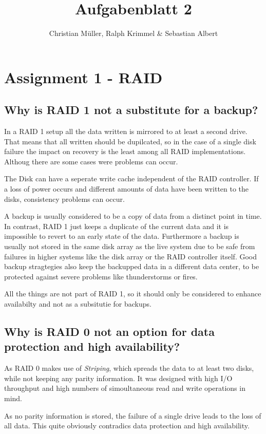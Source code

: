 \documentclass{article}
\title{Aufgabenblatt 2}
\author{Christian Müller, Ralph Krimmel \& Sebastian Albert }
\begin{document}
\maketitle

\section*{Assignment 1 - RAID}

\subsection{Why is RAID 1 not a substitute for a backup?}
	In a RAID 1 setup all the data written is mirrored to at least a second drive.
	That means that all written should be dupilcated,
	so in the case of a single disk failure the impact on recovery is the least among all RAID implementations.
	Althoug there are some cases were problems can occur.

	The Disk can have a seperate write cache independent of the RAID controller.
	If a loss of power occurs and different amounts of data have been written to the disks,
	consistency problems can occur.

	A backup is usually considered to be a copy of data from a distinct point in time.
	In contrast,
	RAID 1 just keeps a duplicate of the current data 
	and it is impossible to revert to an early state of the data.
	Furthermore a backup is usually not stored in the same disk array	as the live system
	due to be safe from failures in higher systems like the disk array or the RAID controller itself.
	Good backup stragtegies also keep the backupped data in a different data center,
	to be protected against severe problems like thunderstorms or fires.

	All the things are not part of RAID 1,
	so it should only be considered to enhance availabilty
	and not as a subsitutie for backups.

\subsection{Why is RAID 0 not an option for data protection and high availability?}
	As RAID 0 makes use of \emph{Striping},
	which spreads the data to at least two disks,
	while not keeping any parity information.
	It was designed with high I/O throughput
	and high numbers of simoultaneous read and write operations in mind.

	As no parity information is stored,
	the failure of a single drive leads to the loss of all data.
	This quite obviously contradics data protection and high availability.
\end{document}
